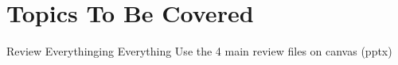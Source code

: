 \documentclass[12pt]{article}
\begin{document}
\maketitle
\section{Topics To Be Covered}
Review Everythinging Everything
Use the 4 main review files on canvas (pptx)
\end{document}
